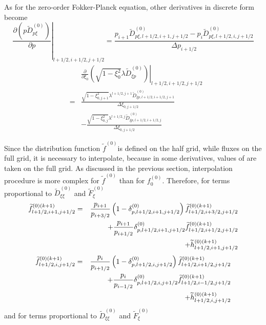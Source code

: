As for the zero-order Fokker-Planck equation, other derivatives in discrete
form become
\begin{equation}
\left. \frac{\partial \left( p\widetilde{D}_{p\xi }^{\left( 0\right)
}\right) }{\partial p}\right| _{l+1/2,i+1/2,j+1/2}=\frac{p_{i+1}\widetilde{D}%
_{p\xi ,l+1/2,i+1,j+1/2}^{\left( 0\right) }-p_{i}\widetilde{D}_{p\xi
,l+1/2,i,j+1/2}^{\left( 0\right) }}{\Delta p_{i+1/2}}
\end{equation}
\begin{eqnarray}
&&\left. \frac{\partial }{\partial \xi _{0}}\left( \sqrt{1-\xi _{0}^{2}}%
\lambda \widetilde{D}_{\xi p}^{\left( 0\right) }\right) \right|
_{l+1/2,i+1/2,j+1/2}  \nonumber \\
&=&\frac{\sqrt{1-\xi _{0,j+1}^{2}}\lambda ^{l+1/2,j+1}\widetilde{D}_{\xi
p,l+1/2,i+1/2,j+1}^{\left( 0\right) }}{\Delta \xi _{0,j+1/2}}  \nonumber \\
&&-\frac{\sqrt{1-\xi _{0,j}^{2}}\lambda ^{l+1/2,j}\widetilde{D}_{\xi
p,l+1/2,i+1/2,j}^{\left( 0\right) }}{\Delta \xi _{0,j+1/2}}
\end{eqnarray}

Since the distribution function $\widetilde{f}^{\left( 0\right) }$is defined
on the half grid, while fluxes on the full grid, it is necessary to
interpolate, because in some derivatives, values of are taken on the full
grid. As discussed in the previous section, interpolation procedure is more
complex for $\widetilde{f}^{\left( 0\right) }$ than for $f_{0}^{\left(
0\right) }.$ Therefore, for terms proportional to $\widetilde{D}_{\xi \xi
}^{\left( 0\right) }$ and $\widetilde{F}_{\xi }^{\left( 0\right) }$%
\begin{eqnarray}
\widetilde{f}_{l+1/2,i+1,j+1/2}^{\left( 0\right) (k+1)} &=&\frac{p_{i+1}}{%
p_{i+3/2}}\left( 1-\delta _{p,l+1/2,i+1,j+1/2}^{(0)}\right) \widetilde{f}%
_{l+1/2,i+3/2,j+1/2}^{(0)(k+1)}  \nonumber \\
&&+\frac{p_{i+1}}{p_{i+1/2}}\delta _{p,l+1/2,i+1,j+1/2}^{(0)}\widetilde{f}%
_{l+1/2,i+1/2,j+1/2}^{(0)(k+1)}  \nonumber \\
&&+\widetilde{h}_{l+1/2,i+1,j+1/2}^{\left( 0\right) (k+1)}
\end{eqnarray}
\begin{eqnarray}
\widetilde{f}_{l+1/2,i,j+1/2}^{\left( 0\right) (k+1)} &=&\frac{p_{i}}{%
p_{i+1/2}}\left( 1-\delta _{p,l+1/2,i,j+1/2}^{(0)}\right) \widetilde{f}%
_{l+1/2,i+1/2,j+1/2}^{(0)(k+1)}  \nonumber \\
&&+\frac{p_{i}}{p_{i-1/2}}\delta _{p,l+1/2,i,j+1/2}^{(0)}\widetilde{f}
_{l+1/2,i-1/2,j+1/2}^{(0)(k+1)}  \nonumber \\
&&+\widetilde{h}_{l+1/2,i,j+1/2}^{\left( 0\right) (k+1)}
\end{eqnarray}
and for terms proportional to $\widetilde{D}_{\xi \xi }^{\left( 0\right) }$
and $\widetilde{F}_{\xi }^{\left( 0\right) }$

